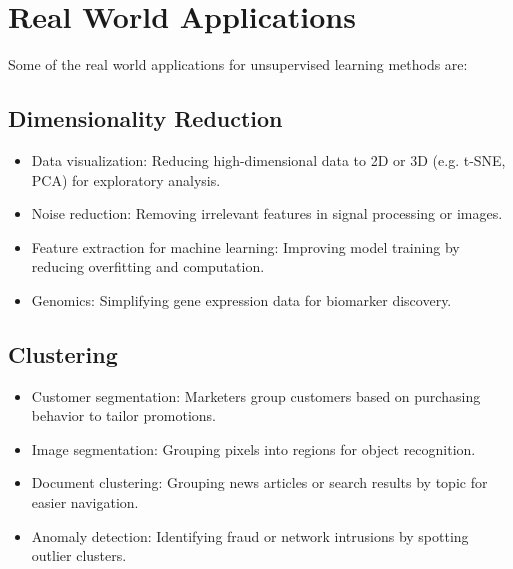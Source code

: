 \documentclass[conference]{IEEEtran}
\begin{document}
\section{Real World Applications}

Some of the real world applications for unsupervised learning methods are:

\subsection{Dimensionality Reduction}
\begin{itemize}
    \item Data visualization: Reducing high-dimensional data to 2D or 3D (e.g. t-SNE, PCA) for exploratory analysis.
    
    \item Noise reduction: Removing irrelevant features in signal processing or images.
    
    \item Feature extraction for machine learning: Improving model training by reducing overfitting and computation.
    
    \item Genomics: Simplifying gene expression data for biomarker discovery.
\end{itemize}

\subsection{Clustering}
\begin{itemize}
    \item Customer segmentation: Marketers group customers based on purchasing behavior to tailor promotions.
    
    \item Image segmentation: Grouping pixels into regions for object recognition.
    
    \item Document clustering: Grouping news articles or search results by topic for easier navigation.
    
    \item Anomaly detection: Identifying fraud or network intrusions by spotting outlier clusters.
\end{itemize}
\end{document}

